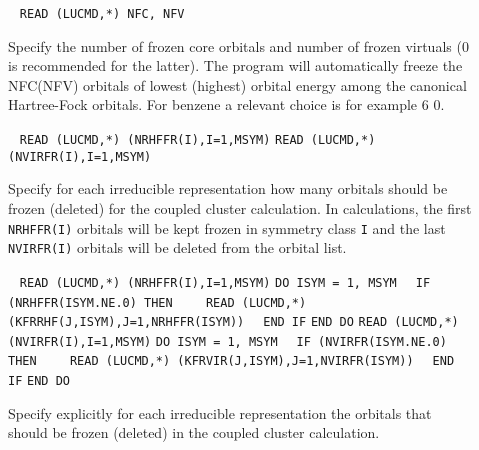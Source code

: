\begin{description}
\item[] \verb| |\newline
      \verb|READ (LUCMD,*) NFC, NFV|

     Specify the number of frozen core orbitals and number of frozen virtuals (0 is recommended for the latter).
     The program will automatically freeze the NFC(NFV) orbitals of lowest (highest) orbital energy
     among the canonical Hartree-Fock orbitals.
     For benzene a relevant choice is for example 6 0.

\item[] \verb| |\newline
      \verb|READ (LUCMD,*) (NRHFFR(I),I=1,MSYM)|\newline
      \verb|READ (LUCMD,*) (NVIRFR(I),I=1,MSYM)|

      Specify for each irreducible representation how
      many orbitals should be frozen (deleted) for the coupled
      cluster calculation. In calculations, the first \verb+NRHFFR(I)+
      orbitals will be kept frozen in symmetry class \verb+I+ and
      the last \verb+NVIRFR(I)+ orbitals will be deleted from the 
      orbital list.
 
\item[]  \verb| |\newline
    \verb|READ (LUCMD,*) (NRHFFR(I),I=1,MSYM)|\newline
    \verb|DO ISYM = 1, MSYM|\newline
    \verb|  IF (NRHFFR(ISYM.NE.0) THEN|\newline
    \verb|    READ (LUCMD,*) (KFRRHF(J,ISYM),J=1,NRHFFR(ISYM))|\newline
    \verb|  END IF|\newline
    \verb|END DO|\newline
    \verb|READ (LUCMD,*) (NVIRFR(I),I=1,MSYM)|\newline
    \verb|DO ISYM = 1, MSYM|\newline
    \verb|  IF (NVIRFR(ISYM.NE.0) THEN|\newline
    \verb|    READ (LUCMD,*) (KFRVIR(J,ISYM),J=1,NVIRFR(ISYM))|\newline
    \verb|  END IF|\newline
    \verb|END DO|

    Specify explicitly for each irreducible representation the
    orbitals that should be frozen (deleted) in the coupled cluster
    calculation.
 

\end{description}
